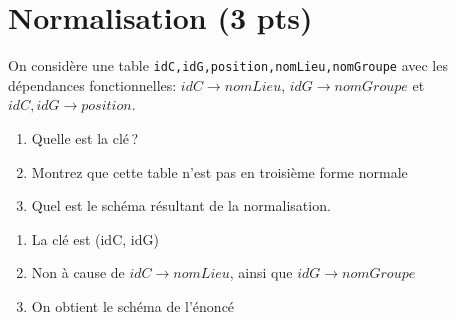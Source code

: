   
\section{Normalisation ({\bf 3 pts})}

On considère une table \texttt{idC,idG,position,nomLieu,nomGroupe} avec
les dépendances fonctionnelles: $idC \to nomLieu$, $idG \to nomGroupe$ et
$idC, idG \to position$.

\begin{enumerate}
   \item Quelle est la clé\,?
   \item Montrez que cette table n'est pas en troisième forme normale
   \item Quel est le schéma résultant de la normalisation.
   
\end{enumerate}
\begin{solution}
   \begin{enumerate}
      \item La clé est (idC, idG)
       \item Non à cause de $idC \to nomLieu$, ainsi que $idG \to nomGroupe$
       \item On obtient le schéma de l'énoncé
    \end{enumerate}
\end{solution}

